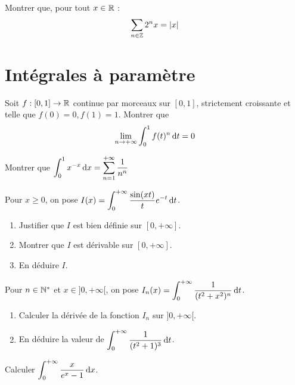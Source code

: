 \documentclass[12pt,a4paper]{exo_book}
\begin{document}
\begin{exo}
    Montrer que, pour tout $x \in \mathbb{R}$ :
    \[
        \sum_{n \in \mathbb{Z}} 2^{n}x = \left|x\right|  
    \]
\end{exo}

\chapter{Intégrales à paramètre}

\begin{exo}
    Soit $f : [0,1] \to \mathbb{R}$ continue par morceaux sur $[0,1]$, strictement croissante et telle que $f(0) = 0, f(1) = 1$. Montrer que
    \[\lim_{n\to+\infty} \int_0^1 f(t)^n {\rm \, d} t = 0\]
\end{exo}

\begin{exo}
    Montrer que $\displaystyle \int_0^1 x^{-x} {\rm \, d} x = \sum_{n=1}^{+\infty} \frac{1}{n^n}$
\end{exo}

\begin{exo}
    Pour $x \ge 0$, on pose $\displaystyle I(x) = \int_0^{+\infty} \frac{\sin(xt)}{t} e^{-t} {\rm \, d} t$.

    \begin{enumerate}
        \item Justifier que $I$ est bien définie sur $[0, +\infty]$.
        \item Montrer que $I$ est dérivable sur $[0, +\infty]$.
        \item En déduire $I$.
    \end{enumerate}
\end{exo}

\begin{exo}
    Pour $n \in \mathbb{N}^*$ et $x \in ]0,+\infty[$, on pose $\displaystyle I_n (x) = \int_0^{+\infty} \frac{1}{(t^2 + x^2)^n} {\rm \, d} t$.
    \begin{enumerate}
        \item Calculer la dérivée de la fonction $I_n$ sur $]0, +\infty[$.
        \item En déduire la valeur de $\displaystyle \int_0^{+\infty} \frac{1}{(t^2 + 1)^3} {\rm \, d} t$.
    \end{enumerate}
\end{exo}

\begin{exo}
    Calculer $\displaystyle \int_0^{+\infty} \frac{x}{e^x - 1} {\rm \, d} x$.
\end{exo}
\end{document}
